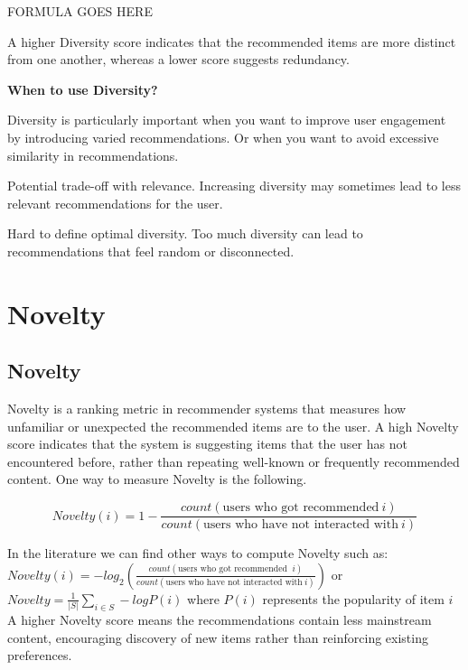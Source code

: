 \begin{center}
    FORMULA GOES HERE
\end{center}

A higher Diversity score indicates that the recommended items are more distinct from one another, whereas a lower score
suggests redundancy.

\textbf{When to use Diversity?}

Diversity is particularly important when you want to improve user engagement by introducing varied recommendations. Or when
you want to avoid excessive similarity in recommendations.

{
    \item Potential trade-off with relevance. Increasing diversity may sometimes lead to less relevant recommendations
    for the user.
    \item Hard to define optimal diversity. Too much diversity can lead to recommendations that feel random or disconnected.
}

\clearpage
\thispagestyle{rankingstyle}
\section{Novelty}
\subsection{Novelty}

Novelty is a ranking metric in recommender systems that measures how unfamiliar or unexpected the recommended items are to
the user. A high Novelty score indicates that the system is suggesting items that the user has not encountered before,
rather than repeating well-known or frequently recommended content. One way to measure Novelty is the following.

\begin{center}
    \[
        Novelty(i) = 1 - \frac{count(\text{users who got recommended} \: i)}{count(\text{users who have not interacted with} \: i)}
    \]
\end{center}

In the literature we can find other ways to compute Novelty such as: $Novelty(i) = -log_2 \left( \frac{count(\text{users who got recommended } \: i)}{count(\text{users who have not interacted with} \: i)} \right)$
or $Novelty = \frac{1}{|S|} \sum_{i \in S} -log P(i)$ where $P(i)$ represents the popularity of item \( i \)
A higher Novelty score means the recommendations contain less mainstream content, encouraging discovery of new items rather
than reinforcing existing preferences.

